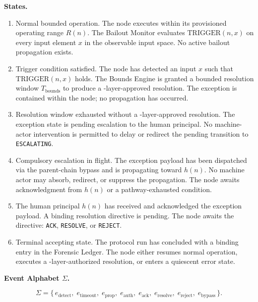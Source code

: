 \medskip
\noindent\textbf{States.}

\begin{enumerate}\itemsep=0pt
\item[\textbf{IDLE.}] Normal bounded operation. The node executes within its provisioned operating range $R(n)$. The Bailout Monitor evaluates $\text{TRIGGER}(n, x)$ on every input element $x$ in the observable input space. No active bailout propagation exists.
\item[\textbf{BOUNDED.}] Trigger condition satisfied. The node has detected an input $x$ such that $\text{TRIGGER}(n, x)$ holds. The Bounds Engine is granted a bounded resolution window $T_{\text{bounds}}$ to produce a \fact-layer-approved resolution. The exception is contained within the node; no propagation has occurred.
\item[\textbf{BAIL\_PENDING.}] Resolution window exhausted without a \fact-layer-approved resolution. The exception state is pending escalation to the human principal. No machine-actor intervention is permitted to delay or redirect the pending transition to \texttt{ESCALATING}.
\item[\textbf{ESCALATING.}] Compulsory escalation in flight. The exception payload has been dispatched via the parent-chain bypass and is propagating toward $h(n)$. No machine actor may absorb, redirect, or suppress the propagation. The node awaits acknowledgment from $h(n)$ or a pathway-exhausted condition.
\item[\textbf{HUMAN\_ACKNOWLEDGED.}] The human principal $h(n)$ has received and acknowledged the exception payload. A binding resolution directive is pending. The node awaits the directive: \texttt{ACK}, \texttt{RESOLVE}, or \texttt{REJECT}.
\item[\textbf{RESOLVED.}] Terminal accepting state. The protocol run has concluded with a binding entry in the Forensic Ledger. The node either resumes normal operation, executes a \purpose-layer-authorized resolution, or enters a quiescent error state.
\end{enumerate}

\medskip
\noindent\textbf{Event Alphabet $\Sigma$.}

\[
\Sigma = \{\,e_{\text{detect}},\; e_{\text{timeout}},\; e_{\text{prop}},\; e_{\text{auth}},\; e_{\text{ack}},\; e_{\text{resolve}},\; e_{\text{reject}},\; e_{\text{bypass}}\,\}.
\]

